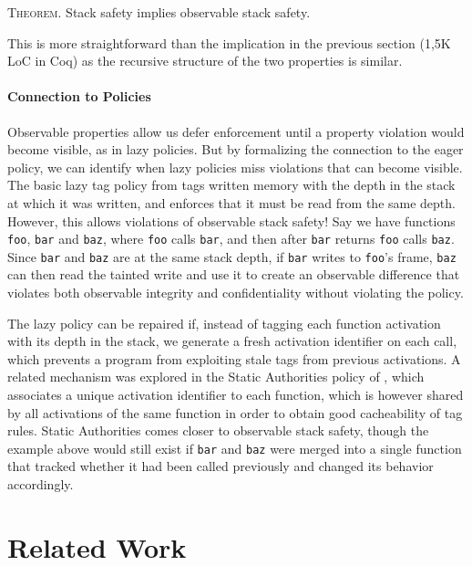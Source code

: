\documentclass[acmsmall,review,anonymous]{acmart}\settopmatter{printfolios=true,printccs=false,printacmref=false}
\begin{document}
{{      \medskip
      \textsc{Theorem.}
      Stack safety implies observable stack safety.
      \smallskip

      This is more straightforward than the implication in the previous
      section (1,5K LoC in Coq) as the recursive
      structure of the two properties is similar.

    \paragraph{Connection to Policies}

    Observable properties allow us defer enforcement until a property
    violation would become visible, as in lazy policies. But by formalizing
    the connection to the eager policy, we can identify when lazy policies
    miss violations that can become visible. The basic lazy tag policy from
    \citet{DBLP:conf/sp/RoesslerD18} tags written memory with the depth in the
    stack at which it was written, and enforces that it must be read from the
    same depth. However, this allows violations of observable stack safety!
    Say we have functions {\tt foo}, {\tt bar} and {\tt baz}, where {\tt foo}
    calls {\tt bar}, and then after {\tt bar} returns {\tt foo} calls
    {\tt baz}. Since {\tt bar} and {\tt baz} are at the same stack depth, if
    {\tt bar} writes to {\tt foo}'s frame, {\tt baz} can then read the tainted
    write and use it to create an observable difference that violates both
    observable integrity and confidentiality without violating the policy.

    The lazy policy can be repaired if, instead of tagging each function
    activation with its depth in the stack, we generate a fresh activation
    identifier on each call, which prevents a program from exploiting stale
    tags from previous activations. A related mechanism was explored in the
    Static Authorities policy of \citet{DBLP:conf/sp/RoesslerD18}, which
    associates a unique activation identifier to each function, which is
    however shared by all activations of the same function in order to obtain
    good cacheability of tag rules. Static Authorities comes closer to
    observable stack safety, though the example above would still exist
    if {\tt bar} and {\tt baz} were merged into a single function that tracked
    whether it had been called previously and changed its behavior accordingly.


\section{Related Work}
\label{sec:relwork}

}}
\end{document}
